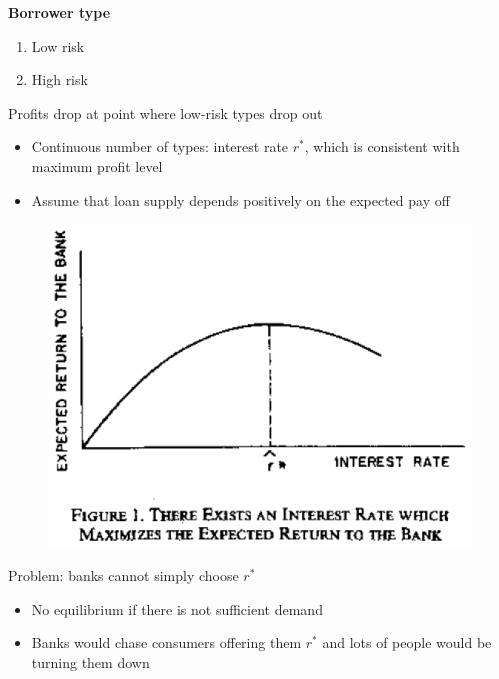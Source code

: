 \documentclass{beamer}
\begin{document}
\begin{frame} 
 \textbf{Borrower type}
 \begin{enumerate}
   \item Low risk
   \item High risk
 \end{enumerate}
 Profits drop at point where low-risk types drop out
 \begin{itemize}
   \item Continuous number of types: interest rate $r^*$, which is consistent with maximum profit level
   \item Assume that loan supply depends positively on the expected pay off
 \end{itemize} 
\end{frame}

\begin{frame}
  \begin{figure}
    \includegraphics{stiglitz_weiss1.eps}
  \end{figure}
\end{frame}

\begin{frame}
Problem: banks cannot simply choose $r^*$
 \begin{itemize}
   \item No equilibrium if there is not sufficient demand
   \item Banks would chase consumers offering them $r^*$ and lots of people would be turning them down
 \end{itemize}
\end{frame}
\end{document}

